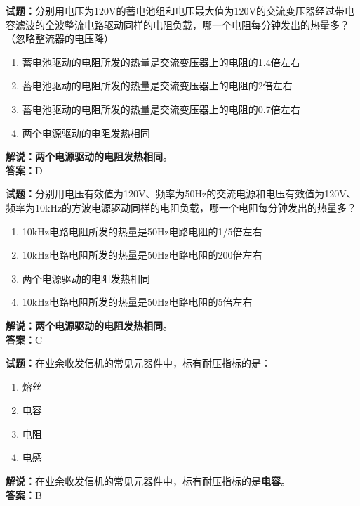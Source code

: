 \documentclass{ctexbook}
\begin{document}
\bigskip


\noindent\textbf{试题：}分别用电压为120V的蓄电池组和电压最大值为120V的交流变压器经过带电容滤波的全波整流电路驱动同样的电阻负载，哪一个电阻每分钟发出的热量多？（忽略整流器的电压降）
\begin{enumerate}[leftmargin=3em]
\item 蓄电池驱动的电阻所发的热量是交流变压器上的电阻的1.4倍左右
\item 蓄电池驱动的电阻所发的热量是交流变压器上的电阻的2倍左右
\item 蓄电池驱动的电阻所发的热量是交流变压器上的电阻的0.7倍左右
\item 两个电源驱动的电阻发热相同
\end{enumerate}
\noindent\textbf{解说：}\textbf{两个电源驱动的电阻发热相同}。\\\noindent\textbf{答案：}D



\bigskip


\noindent\textbf{试题：}分别用电压有效值为120V、频率为50Hz的交流电源和电压有效值为120V、频率为10\unit{\kHz}的方波电源驱动同样的电阻负载，哪一个电阻每分钟发出的热量多？
\begin{enumerate}[leftmargin=3em]
\item 10\unit{\kHz}电路电阻所发的热量是50Hz电路电阻的1/5倍左右
\item 10\unit{\kHz}电路电阻所发的热量是50Hz电路电阻的200倍左右
\item 两个电源驱动的电阻发热相同
\item 10\unit{\kHz}电路电阻所发的热量是50Hz电路电阻的5倍左右
\end{enumerate}
\noindent\textbf{解说：}\textbf{两个电源驱动的电阻发热相同}。\\\noindent\textbf{答案：}C



\bigskip


\noindent\textbf{试题：}在业余收发信机的常见元器件中，标有耐压指标的是：
\begin{enumerate}[leftmargin=3em]
\item 熔丝
\item 电容
\item 电阻
\item 电感
\end{enumerate}
\noindent\textbf{解说：}在业余收发信机的常见元器件中，标有耐压指标的是\textbf{电容}。\\\noindent\textbf{答案：}B

\bigskip
\end{document}
